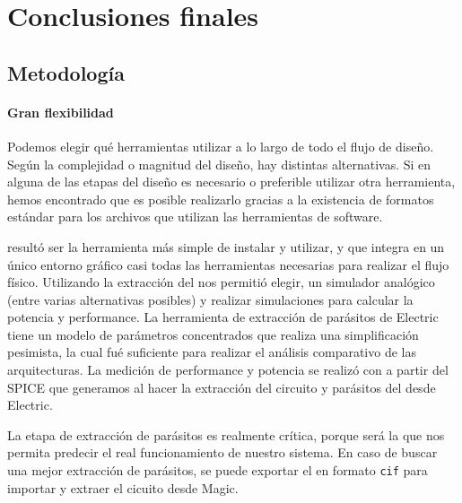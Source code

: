 	\chapter{Conclusiones finales}

  
\section{Metodología}
\subsubsection{Gran flexibilidad} Podemos elegir qué herramientas utilizar a lo largo de todo el flujo de diseño. Según la complejidad o magnitud del diseño, hay distintas alternativas. Si en alguna de las etapas del diseño es necesario o preferible utilizar otra herramienta, hemos encontrado que es posible realizarlo gracias a la existencia de formatos estándar para los archivos que utilizan las herramientas de software.


 resultó ser la herramienta más simple de instalar y utilizar, y que integra en un único entorno gráfico casi todas las herramientas necesarias para realizar el flujo físico. Utilizando la extracción del  nos permitió elegir, un simulador analógico (entre varias alternativas posibles) y realizar simulaciones para calcular la potencia y performance. La herramienta de extracción de parásitos de Electric tiene un modelo de parámetros concentrados que realiza una simplificación pesimista, la cual fué suficiente para realizar el análisis comparativo de las arquitecturas. La medición de performance y potencia se realizó con  a partir del  SPICE que generamos al hacer la extracción del circuito y parásitos del \layout desde Electric.

La etapa de extracción de parásitos es realmente crítica, porque será la que nos permita predecir el real funcionamiento de nuestro sistema. En caso de buscar una mejor extracción de parásitos, se puede exportar el \layout en formato \verb.cif. para importar y extraer el cicuito desde Magic.


